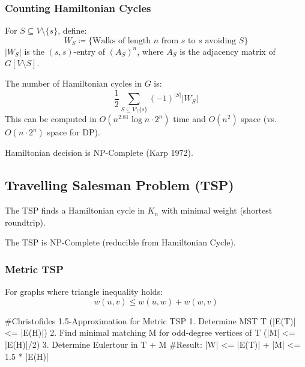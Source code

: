 \subsubsection{Counting Hamiltonian Cycles}

\begin{definition}
For $S \subseteq V \setminus \{s\}$, define:
$$W_S \coloneqq \{ \text{Walks of length } n \text{ from } s \text{ to } s \text{ avoiding } S \}$$
$|W_S|$ is the $(s,s)$-entry of $(A_S)^n$, where $A_S$ is the adjacency matrix of $G[V \setminus S]$.
\end{definition}

\begin{theorem}
The number of Hamiltonian cycles in $G$ is:
$$\frac{1}{2} \sum_{S \subseteq V \setminus \{s\}} (-1)^{|S|} |W_S|$$
This can be computed in $O(n^{2.81} \log n \cdot 2^n)$ time and $O(n^2)$ space (vs. $O(n \cdot 2^n)$ space for DP).
\end{theorem}

\begin{theorem}
Hamiltonian decision is NP-Complete (Karp 1972).
\end{theorem}

\subsection{Travelling Salesman Problem (TSP)}

The TSP finds a Hamiltonian cycle in $K_n$ with minimal weight (shortest roundtrip).

\begin{theorem}
The TSP is NP-Complete (reducible from Hamiltonian Cycle).
\end{theorem}

\subsubsection{Metric TSP}
For graphs where triangle inequality holds:
$$w(u,v) \le w(u,w) + w(w,v)$$


\begin{algorithm}
#Christofides 1.5-Approximation for Metric TSP
1. Determine MST T (|E(T)| <= |E(H)|)
2. Find minimal matching M for odd-degree vertices of T (|M| <= |E(H)|/2)
3. Determine Eulertour in T + M 
#Result: |W| <= |E(T)| + |M| <= 1.5 * |E(H)|
\end{algorithm}
